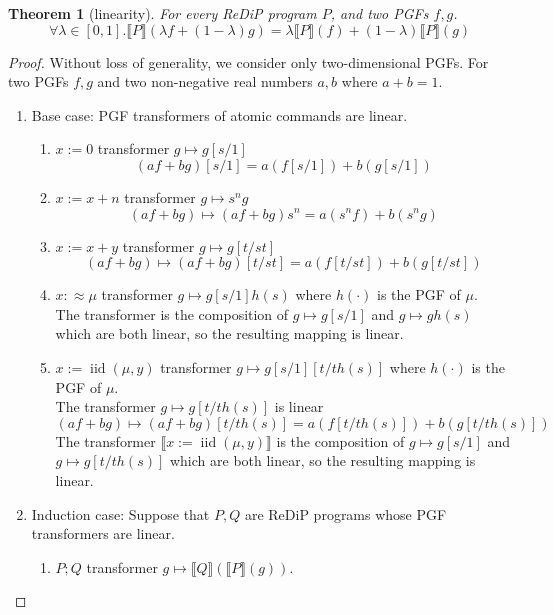 \documentclass[a4paper]{article}
\DeclareMathOperator*{\iid}{iid}
\renewcommand{\S}[1]{ \llbracket #1 \rrbracket }
\newtheorem{theorem}{Theorem}[section]
\begin{document}
\begin{theorem}[linearity]
	For every ReDiP program \(P\), and two PGFs \(f,g\).
	\[
		\forall \lambda\in[0,1] . \S{P}(\lambda f + (1-\lambda) g) = \lambda \S{P}(f) + (1-\lambda)\S{P}(g)
	\]
\end{theorem}
\begin{proof}
	Without loss of generality, we consider only two-dimensional PGFs.
	For two PGFs \(f,g\) and two non-negative real numbers \(a,b\) where \(a+b=1\).
	\begin{enumerate}
		\item Base case: PGF transformers of atomic commands are linear.
		      \begin{enumerate}
			      \item \(x := 0\) transformer \(g\mapsto g[s/1]\)
			            \[
				            (af + bg)[s/1] = a(f[s/1]) + b(g[s/1])
			            \]
			      \item \(x := x+n\) transformer \(g\mapsto s^n g\)
			            \[
				            (af + bg) \mapsto (af + bg)s^n = a(s^n f) + b(s^n g)
			            \]
			      \item \(x := x+y\) transformer \(g\mapsto g[t/st]\)
			            \[
				            (af + bg) \mapsto (af + bg)[t/st] = a(f[t/st]) + b(g[t/st])
			            \]
			      \item \(x :\approx \mu\) transformer \(g\mapsto g[s/1]h(s)\) where \(h(\cdot)\) is the PGF of \(\mu\).\\
			            The transformer is the composition of \(g\mapsto g[s/1]\) and \(g\mapsto g h(s)\) which are both linear,
			            so the resulting mapping is linear.
			      \item \(x := \iid(\mu,y) \) transformer \(g\mapsto g[s/1][t/th(s)]\) where \(h(\cdot)\) is the PGF of \(\mu\).\\
			            The transformer \(g\mapsto g[t/t h(s)]\) is linear
			            \[
				            (af + bg) \mapsto (af + bg)[t/t h(s)] = a(f[t/t h(s)]) + b(g[t/t h(s)])
			            \]
			            The transformer \(\S{x := \iid(\mu,y)}\) is the composition of \(g\mapsto g[s/1]\) and \(g\mapsto g[t/t h(s)]\) which are both linear, so the resulting mapping is linear.
		      \end{enumerate}
		\item Induction case: Suppose that \(P,Q\) are ReDiP programs whose PGF transformers are linear.
		      \begin{enumerate}
			      \item \(P;Q\) transformer \(g\mapsto \S{Q}(\S{P}(g))\).

\end{enumerate}
\end{enumerate}
\end{proof}
\end{document}
